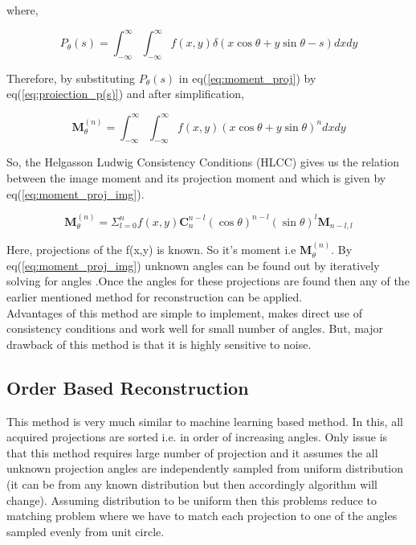 \documentclass{report}
\begin{document}
where,

\begin{equation}\label{eq:proiection_p(s)}
P_\theta(s) =   \int_{-\infty}^{\infty} \int_{-\infty}^{\infty} f(x,y) \delta(x\cos\theta+y\sin\theta - s) dx dy
\end{equation}

\noindent
Therefore, by substituting $P_\theta(s)$ in eq(\ref{eq:moment_proj}) by eq(\ref{eq:proiection_p(s)}) and after simplification,

\begin{equation}
\boldsymbol{M}_{\theta}^{(n)} =   \int_{-\infty}^{\infty} \int_{-\infty}^{\infty} f(x,y) (x\cos\theta+y\sin\theta)^n dxdy
\end{equation}

\noindent
So, the Helgasson Ludwig Consistency Conditions (HLCC) \cite{malhotra2016tomographic} \cite{basu2000feasibility} \cite{natterer1986mathematics} gives us the relation between the image moment and its projection moment and which is given by eq(\ref{eq:moment_proj_img}).

\begin{equation}\label{eq:moment_proj_img}
\boldsymbol{M}_{\theta}^{(n)} =  \Sigma_{l=0}^n f(x,y) \boldsymbol{C}_n^{n-l} (\cos\theta)^{n-l} (\sin\theta)^l \boldsymbol{M}_{n-l,l}
\end{equation}

\noindent
Here, projections of the f(x,y) is known. So it's moment i.e $\boldsymbol{M}_{\theta}^{(n)}$. By eq(\ref{eq:moment_proj_img}) unknown angles can be found out by iteratively solving for angles \cite{malhotra2016tomographic}.Once the angles for these projections are found then any of the earlier mentioned method for reconstruction can be applied. \\

\noindent
Advantages of this method are simple to implement, makes direct use of consistency conditions and work well for small number of angles. But, major drawback of this method is that it is highly sensitive to noise.

\subsection{Order Based Reconstruction}\label{subsec:recont_order-based}
This method is very much similar to machine learning based method. In this, all acquired projections are sorted i.e. in order of increasing angles. Only issue is that this method requires large number of projection and it assumes the all unknown projection angles are independently sampled from uniform distribution (it can be from any known distribution but then accordingly algorithm will change). Assuming distribution to be uniform then this problems reduce to matching problem where we have to match each projection to one of the angles sampled evenly from unit circle.\\
\end{document}
